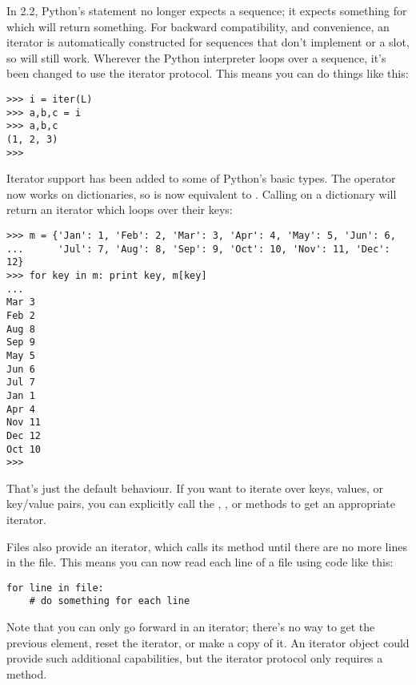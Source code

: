 \documentclass{howto}
\begin{document}
In 2.2, Python's  statement no longer expects a sequence;
it expects something for which  will return something.
For backward compatibility, and convenience, an iterator is
automatically constructed for sequences that don't implement
 or a  slot, so  will still work.  Wherever the Python interpreter loops over
a sequence, it's been changed to use the iterator protocol.  This
means you can do things like this:

\begin{verbatim}
>>> i = iter(L)
>>> a,b,c = i
>>> a,b,c
(1, 2, 3)
>>>
\end{verbatim}

Iterator support has been added to some of Python's basic types.  The
 operator now works on dictionaries, so  is now equivalent to .
Calling  on a dictionary will return an iterator which loops over their keys:

\begin{verbatim}
>>> m = {'Jan': 1, 'Feb': 2, 'Mar': 3, 'Apr': 4, 'May': 5, 'Jun': 6,
...      'Jul': 7, 'Aug': 8, 'Sep': 9, 'Oct': 10, 'Nov': 11, 'Dec': 12}
>>> for key in m: print key, m[key]
...
Mar 3
Feb 2
Aug 8
Sep 9
May 5
Jun 6
Jul 7
Jan 1
Apr 4
Nov 11
Dec 12
Oct 10
>>>
\end{verbatim}          

That's just the default behaviour.  If you want to iterate over keys,
values, or key/value pairs, you can explicitly call the
, , or 
methods to get an appropriate iterator.  

Files also provide an iterator, which calls its 
method until there are no more lines in the file.  This means you can
now read each line of a file using code like this:

\begin{verbatim}
for line in file:
    # do something for each line
\end{verbatim}

Note that you can only go forward in an iterator; there's no way to
get the previous element, reset the iterator, or make a copy of it.
An iterator object could provide such additional capabilities, but the iterator protocol only requires a  method.

\begin{seealso}


\end{seealso}
\end{document}

